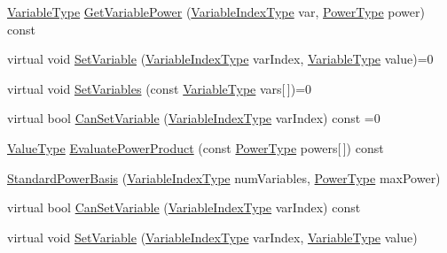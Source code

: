 \begin{DoxyCompactItemize}
\item 
\hyperlink{classnmr_multi_variable_power_basis_a7089007a79cce8d2eb3672e2d61af06c}{Variable\-Type} \hyperlink{classnmr_multi_variable_power_basis_a88d13668e5bfc554ab80c5eef901bf25}{Get\-Variable\-Power} (\hyperlink{classnmr_multi_variable_power_basis_ae125326a623043fcfd020aeeefd1cce6}{Variable\-Index\-Type} var, \hyperlink{classnmr_multi_variable_power_basis_a2cb67df83e9fcac213848fa7a7295fcc}{Power\-Type} power) const 
\item 
virtual void \hyperlink{classnmr_multi_variable_power_basis_a6725bd03e0272877f0737187345aab6d}{Set\-Variable} (\hyperlink{classnmr_multi_variable_power_basis_ae125326a623043fcfd020aeeefd1cce6}{Variable\-Index\-Type} var\-Index, \hyperlink{classnmr_multi_variable_power_basis_a7089007a79cce8d2eb3672e2d61af06c}{Variable\-Type} value)=0
\item 
virtual void \hyperlink{classnmr_multi_variable_power_basis_a250029c052022602969689861c94a5c2}{Set\-Variables} (const \hyperlink{classnmr_multi_variable_power_basis_a7089007a79cce8d2eb3672e2d61af06c}{Variable\-Type} vars\mbox{[}$\,$\mbox{]})=0
\item 
virtual bool \hyperlink{classnmr_multi_variable_power_basis_a0daa96cef75af539771b7033b3b7ab05}{Can\-Set\-Variable} (\hyperlink{classnmr_multi_variable_power_basis_ae125326a623043fcfd020aeeefd1cce6}{Variable\-Index\-Type} var\-Index) const =0
\item 
\hyperlink{classnmr_multi_variable_power_basis_af4a74a68c8bac235645e3f37f2f464e5}{Value\-Type} \hyperlink{classnmr_multi_variable_power_basis_a740a38e7dab7a1c80050293595424d69}{Evaluate\-Power\-Product} (const \hyperlink{classnmr_multi_variable_power_basis_a2cb67df83e9fcac213848fa7a7295fcc}{Power\-Type} powers\mbox{[}$\,$\mbox{]}) const 
\item 
\hyperlink{classnmr_multi_variable_power_basis_a7aea4d2b9847560899648720ee61b988}{Standard\-Power\-Basis} (\hyperlink{classnmr_multi_variable_power_basis_ae125326a623043fcfd020aeeefd1cce6}{Variable\-Index\-Type} num\-Variables, \hyperlink{classnmr_multi_variable_power_basis_a2cb67df83e9fcac213848fa7a7295fcc}{Power\-Type} max\-Power)
\item 
virtual bool \hyperlink{classnmr_multi_variable_power_basis_abcaeac7c3a176d67ff36be3cabd12de1}{Can\-Set\-Variable} (\hyperlink{classnmr_multi_variable_power_basis_ae125326a623043fcfd020aeeefd1cce6}{Variable\-Index\-Type} var\-Index) const 
\item 
virtual void \hyperlink{classnmr_multi_variable_power_basis_a9e01a0a65e51201f44851c34a68fdd59}{Set\-Variable} (\hyperlink{classnmr_multi_variable_power_basis_ae125326a623043fcfd020aeeefd1cce6}{Variable\-Index\-Type} var\-Index, \hyperlink{classnmr_multi_variable_power_basis_a7089007a79cce8d2eb3672e2d61af06c}{Variable\-Type} value)

\end{DoxyCompactItemize}
